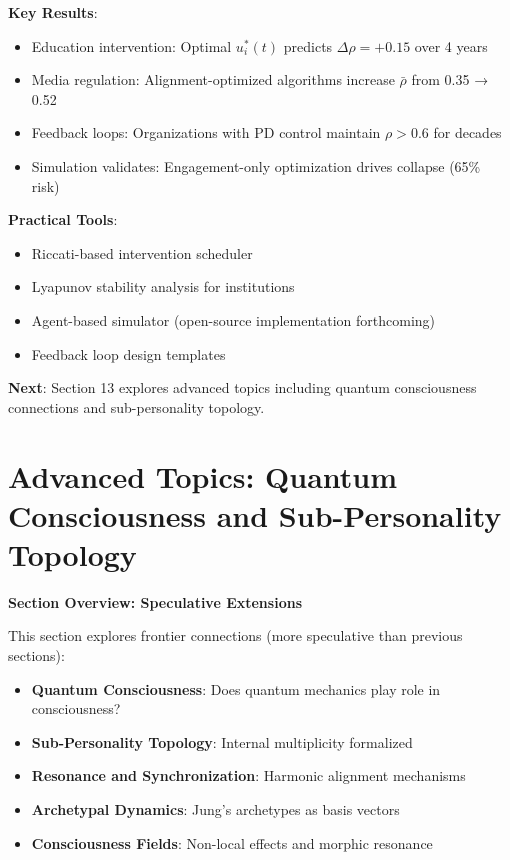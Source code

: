 \documentclass[11pt,a4paper]{article}
\theoremstyle{definition}
\theoremstyle{remark}
\begin{document}
\begin{small}
\begin{enumerate}
\begin{mdframed}[backgroundcolor=green!10,linewidth=2pt,linecolor=green!70!black]
\textbf{Key Results}:
\begin{itemize}[nosep]
    \item Education intervention: Optimal \(u_i^*(t)\) predicts \(\Delta\rho = +0.15\) over 4 years
    \item Media regulation: Alignment-optimized algorithms increase \(\bar{\rho}\) from 0.35 → 0.52
    \item Feedback loops: Organizations with PD control maintain \(\rho > 0.6\) for decades
    \item Simulation validates: Engagement-only optimization drives collapse (65\% risk)
\end{itemize}

\textbf{Practical Tools}:
\begin{itemize}[nosep]
    \item Riccati-based intervention scheduler
    \item Lyapunov stability analysis for institutions
    \item Agent-based simulator (open-source implementation forthcoming)
    \item Feedback loop design templates
\end{itemize}

\textbf{Next}: Section 13 explores advanced topics including quantum consciousness connections and sub-personality topology.
\end{mdframed}


\section{Advanced Topics: Quantum Consciousness and Sub-Personality Topology}

\begin{mdframed}[backgroundcolor=cyan!5,linewidth=2pt]
\textbf{Section Overview: Speculative Extensions}

This section explores frontier connections (more speculative than previous sections):

\begin{itemize}[nosep]
    \item \textbf{Quantum Consciousness}: Does quantum mechanics play role in consciousness?
    \item \textbf{Sub-Personality Topology}: Internal multiplicity formalized
    \item \textbf{Resonance and Synchronization}: Harmonic alignment mechanisms
    \item \textbf{Archetypal Dynamics}: Jung's archetypes as basis vectors
    \item \textbf{Consciousness Fields}: Non-local effects and morphic resonance
\end{itemize}


\end{mdframed}
\end{enumerate}
\end{small}
\end{document}
